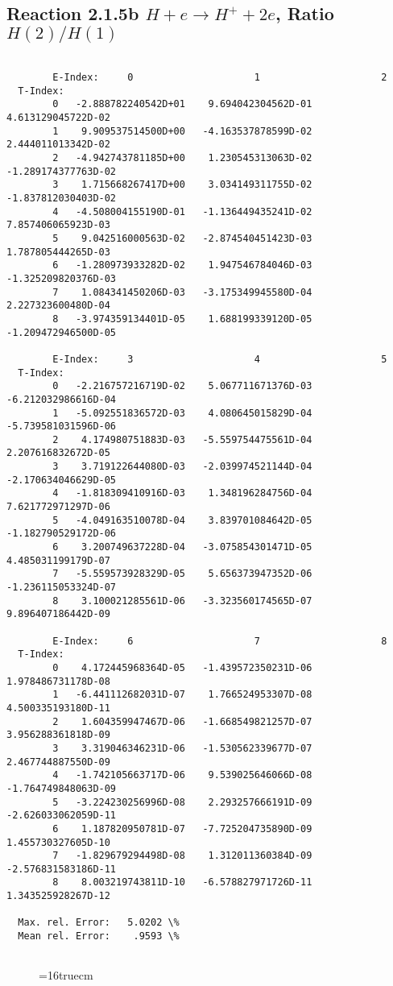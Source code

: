 \documentclass[12pt,dvipdfmx]{article}
\begin{document}
\newpage
\subsection{
Reaction 2.1.5b  $H + e \rightarrow H^+ + 2e$, Ratio $H(2)/H(1)$
}


\begin{small}\begin{verbatim}

        E-Index:     0                     1                     2
  T-Index:
        0   -2.888782240542D+01    9.694042304562D-01    4.613129045722D-02
        1    9.909537514500D+00   -4.163537878599D-02    2.444011013342D-02
        2   -4.942743781185D+00    1.230545313063D-02   -1.289174377763D-02
        3    1.715668267417D+00    3.034149311755D-02   -1.837812030403D-02
        4   -4.508004155190D-01   -1.136449435241D-02    7.857406065923D-03
        5    9.042516000563D-02   -2.874540451423D-03    1.787805444265D-03
        6   -1.280973933282D-02    1.947546784046D-03   -1.325209820376D-03
        7    1.084341450206D-03   -3.175349945580D-04    2.227323600480D-04
        8   -3.974359134401D-05    1.688199339120D-05   -1.209472946500D-05

        E-Index:     3                     4                     5
  T-Index:
        0   -2.216757216719D-02    5.067711671376D-03   -6.212032986616D-04
        1   -5.092551836572D-03    4.080645015829D-04   -5.739581031596D-06
        2    4.174980751883D-03   -5.559754475561D-04    2.207616832672D-05
        3    3.719122644080D-03   -2.039974521144D-04   -2.170634046629D-05
        4   -1.818309410916D-03    1.348196284756D-04    7.621772971297D-06
        5   -4.049163510078D-04    3.839701084642D-05   -1.182790529172D-06
        6    3.200749637228D-04   -3.075854301471D-05    4.485031199179D-07
        7   -5.559573928329D-05    5.656373947352D-06   -1.236115053324D-07
        8    3.100021285561D-06   -3.323560174565D-07    9.896407186442D-09

        E-Index:     6                     7                     8
  T-Index:
        0    4.172445968364D-05   -1.439572350231D-06    1.978486731178D-08
        1   -6.441112682031D-07    1.766524953307D-08    4.500335193180D-11
        2    1.604359947467D-06   -1.668549821257D-07    3.956288361818D-09
        3    3.319046346231D-06   -1.530562339677D-07    2.467744887550D-09
        4   -1.742105663717D-06    9.539025646066D-08   -1.764749848063D-09
        5   -3.224230256996D-08    2.293257666191D-09   -2.626033062059D-11
        6    1.187820950781D-07   -7.725204735890D-09    1.455730327605D-10
        7   -1.829679294498D-08    1.312011360384D-09   -2.576831583186D-11
        8    8.003219743811D-10   -6.578827971726D-11    1.343525928267D-12

  Max. rel. Error:   5.0202 \%
  Mean rel. Error:    .9593 \%


\end{verbatim}\end{small}
\begin{figure} \label{2.1.5b}
\epsfxsize=16truecm
\end{figure}
\end{document}
